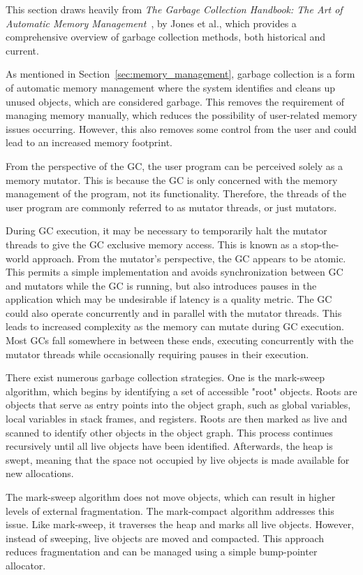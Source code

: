 
This section draws heavily from \textit{The Garbage Collection Handbook: The Art of Automatic Memory Management}~\cite{gchandbook}, by Jones et al., which provides a comprehensive overview of garbage collection methods, both historical and current.

As mentioned in Section~\ref{sec:memory_management}, garbage collection is a form of automatic memory management where the system identifies and cleans up unused objects, which are considered garbage. This removes the requirement of managing memory manually, which reduces the possibility of user-related memory issues occurring. However, this also removes some control from the user and could lead to an increased memory footprint.

From the perspective of the GC, the user program can be perceived solely as a memory mutator. This is because the GC is only concerned with the memory management of the program, not its functionality. Therefore, the threads of the user program are commonly referred to as mutator threads, or just mutators.

During GC execution, it may be necessary to temporarily halt the mutator threads to give the GC exclusive memory access. This is known as a stop-the-world approach. From the mutator's perspective, the GC appears to be atomic. This permits a simple implementation and avoids synchronization between GC and mutators while the GC is running, but also introduces pauses in the application which may be undesirable if latency is a quality metric. The GC could also operate concurrently and in parallel with the mutator threads. This leads to increased complexity as the memory can mutate during GC execution. Most GCs fall somewhere in between these ends, executing concurrently with the mutator threads while occasionally requiring pauses in their execution.

There exist numerous garbage collection strategies. One is the mark-sweep algorithm, which begins by identifying a set of accessible "root" objects. Roots are objects that serve as entry points into the object graph, such as global variables, local variables in stack frames, and registers. Roots are then marked as live and scanned to identify other objects in the object graph. This process continues recursively until all live objects have been identified. Afterwards, the heap is swept, meaning that the space not occupied by live objects is made available for new allocations.

The mark-sweep algorithm does not move objects, which can result in higher levels of external fragmentation. The mark-compact algorithm addresses this issue. Like mark-sweep, it traverses the heap and marks all live objects. However, instead of sweeping, live objects are moved and compacted. This approach reduces fragmentation and can be managed using a simple bump-pointer allocator. 

